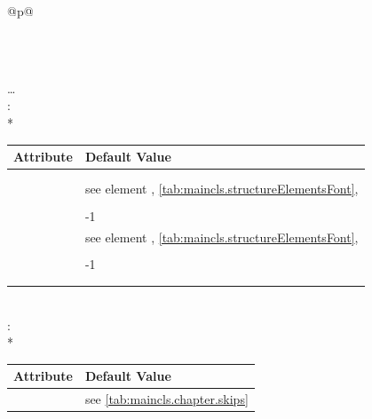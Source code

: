   \begin{longtable}{@{}p{\columnwidth}@{}}
    \caption{Defaults for the headings of  and
      }%
    \label{tab:maincls.section.defaults}\\
    \endfirsthead
    \caption[]{Default for the headings of  and
       \emph{(continued)}}\\
    \addlinespace[-\normalbaselineskip]
    \endhead
    \raggedleft\dots\\
    \endfoot
    \endlastfoot
    : \\*
    \begin{tabularx}{\linewidth}{ll}
    \toprule
    Attribute & Default Value \\
    \midrule
    \PValue{afterskip}   & \PValue{0pt plus 1fil} \\
    \PValue{beforeskip}  & \PValue{0pt plus 1fil + \Length{baselineskip}} \\
    \PValue{font}        & see element \DescRef{maincls.fontelement.part},
                           \autoref{tab:maincls.structureElementsFont},
                           \autopageref{tab:maincls.structureElementsFont} \\
    \PValue{innerskip}   & \PValue{20pt} \\
    \PValue{level}       & -1 \\
    \PValue{prefixfont}  & see element
                           \DescRef{maincls.fontelement.partnumber},
                           \autoref{tab:maincls.structureElementsFont},
                           \autopageref{tab:maincls.structureElementsFont} \\
    \PValue{tocindent}   & \PValue{0pt} \\
    \PValue{toclevel}    & -1 \\
    \PValue{tocnumwidth} & \PValue{2em} \\
    \PValue{tocstyle}    & \PValue{part} \\
    \bottomrule
    \end{tabularx} \\
    \addlinespace[\normalbaselineskip]
    : \\*
    \begin{tabularx}{\linewidth}{ll}
    \toprule
    Attribute & Default Value \\
    \midrule
    \PValue{afterskip}   & see \autoref{tab:maincls.chapter.skips} \\

\end{tabularx}
\end{longtable}
